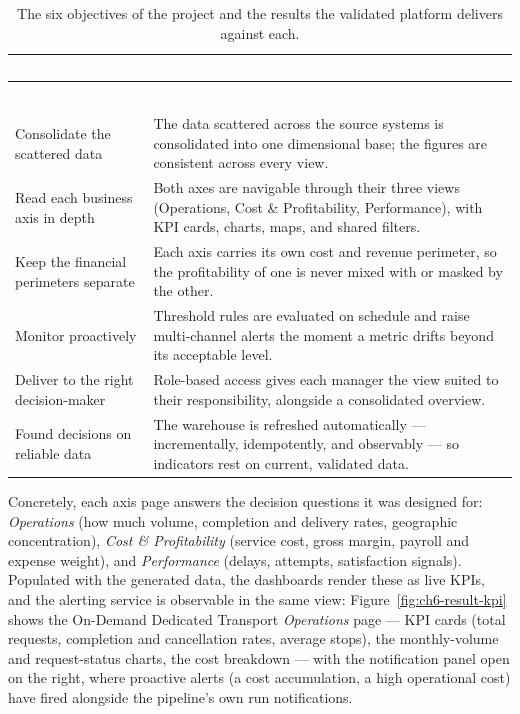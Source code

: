 \begingroup
\renewcommand{\arraystretch}{1.35}
\begin{xltabular}{\linewidth}{|>{\raggedright\arraybackslash}p{4.0cm}|>{\raggedright\arraybackslash}X|}
\caption{The six objectives of the project and the results the validated platform delivers against
each.}
\label{tab:ch6-results} \\
\hline
{}
\textcolor{white}{\textbf{Objective}} & \textcolor{white}{\textbf{Result delivered}} \\
\hline
\endfirsthead
\hline
{}
\textcolor{white}{\textbf{Objective}} & \textcolor{white}{\textbf{Result delivered}} \\
\hline
\endhead
\hline
{} \\
\endfoot
\endlastfoot
Consolidate the scattered data & The data scattered across the source systems is consolidated into one
dimensional base; the figures are consistent across every view. \\
Read each business axis in depth & Both axes are navigable through their three views (Operations, Cost \&
Profitability, Performance), with KPI cards, charts, maps, and shared filters. \\
Keep the financial perimeters separate & Each axis carries its own cost and revenue perimeter, so the
profitability of one is never mixed with or masked by the other. \\
Monitor proactively & Threshold rules are evaluated on schedule and raise multi-channel alerts the moment
a metric drifts beyond its acceptable level. \\
Deliver to the right decision-maker & Role-based access gives each manager the view suited to their
responsibility, alongside a consolidated overview. \\
Found decisions on reliable data & The warehouse is refreshed automatically --- incrementally,
idempotently, and observably --- so indicators rest on current, validated data. \\
\hline
\end{xltabular}
\endgroup

Concretely, each axis page answers the decision questions it was designed for: \emph{Operations} (how
much volume, completion and delivery rates, geographic concentration), \emph{Cost \& Profitability}
(service cost, gross margin, payroll and expense weight), and \emph{Performance} (delays, attempts,
satisfaction signals). Populated with the generated data, the dashboards render these as live KPIs, and
the alerting service is observable in the same view: Figure~\ref{fig:ch6-result-kpi} shows the
On-Demand Dedicated Transport \emph{Operations} page --- KPI cards (total requests, completion and
cancellation rates, average stops), the monthly-volume and request-status charts, the cost breakdown ---
with the notification panel open on the right, where proactive alerts (a cost accumulation, a high
operational cost) have fired alongside the pipeline's own run notifications.

